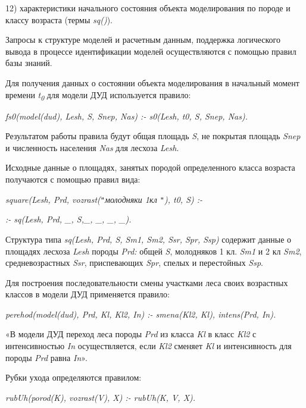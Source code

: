 \documentclass{article}
\begin{document}
12) характеристики начального состояния объекта 
моделирования  по породе и классу возраста 
(термы \textit{sq()}).

Запросы к структуре моделей и расчетным данным, 
поддержка логического вывода в процессе идентификации 
моделей осуществляются с помощью правил базы 
знаний.

Для получения данных о состоянии объекта моделирования 
в начальный момент времени \textit{t}\textsubscript{\textit{0}} 
для модели ДУД используется правило:

\begin{center}
\textit{fs0(model(dud), Lesh, S, Snep, Nas) :- s0(Lesh, t0, S, Snep, Nas).}
\end{center}

Результатом работы правила будут общая площадь 
\textit{S}, не покрытая площадь \textit{Snep} и численность 
населения \textit{Nas} для лесхоза \textit{Lesh}.

Исходные данные о площадях, занятых породой 
определенного класса возраста получаются с 
помощью правил вида:

\begin{center}
\textit{square(Lesh, Prd, vozrast(\texttt{"}молодняки 1кл \texttt{"}), 
t0, S) :-}

\textit{:- sq(Lesh, Prd, \_, S,\_, \_, \_, \_).}
\end{center}

Структура типа \textit{sq(Lesh, Prd, S, Sm1, Sm2, Ssr, Spr, Ssp) }содержит 
данные о площадях лесхоза \textit{Lesh} породы \textit{Prd:} 
общей \textit{S}, молодняков 1 кл. \textit{Sm1} и 2 кл \textit{Sm2}, 
средневозрастных \textit{Ssr}, приспевающих \textit{Spr}, 
спелых и перестойных \textit{Ssp}.

Для построения последовательности смены участками 
леса своих возрастных классов в модели ДУД 
применяется правило:

\begin{center}
\textit{perehod(model(dud), Prd, Kl, Kl2, In) :- smena(Kl2, Kl), intens(Prd, In).}
\end{center}

«В модели ДУД переход леса породы \textit{Prd} из 
класса \textit{Kl} в класс \textit{Kl2} с интенсивностью\textit{ 
In }осуществляется, если \textit{Kl2 }сменяет \textit{Kl} 
и интенсивность для породы \textit{Prd} равна \textit{In}».

Рубки ухода определяются правилом:

\begin{center}
\textit{rubUh(porod(K), vozrast(V), X) :- rubUh(K, V, X).}
\end{center}
\end{document}
